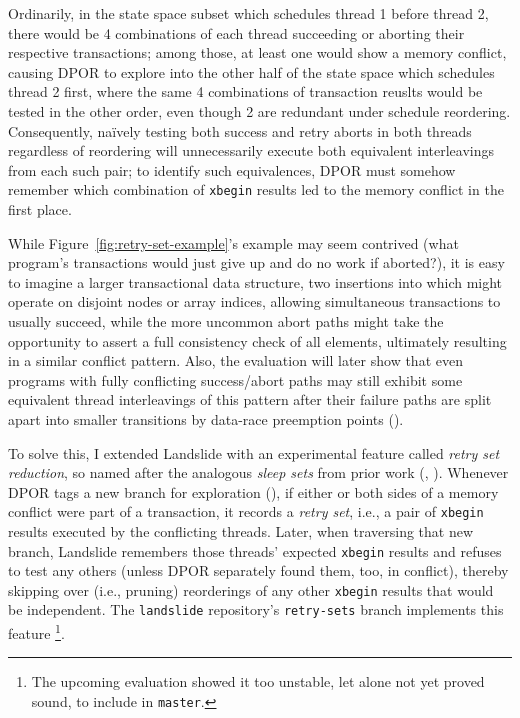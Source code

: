 Ordinarily, in the state space subset which schedules thread 1 before thread 2,
there would be 4 combinations of each thread succeeding or aborting their respective transactions;
among those, at least one would show a memory conflict,
causing DPOR to explore into the other half of the state space which schedules thread 2 first,
where the same 4 combinations of transaction reuslts would be tested in the other order,
even though 2 are redundant under schedule reordering.
Consequently, na\"ively testing both success and retry aborts in both threads regardless of reordering
will unnecessarily execute %
both equivalent interleavings from each such pair;
to identify such equivalences,
DPOR must somehow remember which combination of {\tt xbegin} results led to the memory conflict in the first place.

While Figure~\ref{fig:retry-set-example}'s example may seem contrived
(what program's transactions would just give up and do no work if aborted?),
it is easy to imagine a larger transactional data structure,
two insertions into which might operate on disjoint nodes or array indices,
allowing simultaneous transactions to usually succeed,
while the more uncommon abort paths might take the opportunity to assert a full consistency check of all elements,
ultimately resulting in a similar conflict pattern.
Also, the evaluation will later show
that even programs with fully conflicting success/abort paths
may still exhibit some equivalent thread interleavings of this pattern
after their failure paths are split apart into smaller transitions by data-race preemption points
(\sect{\ref{sec:tm-eval-retrysets}}).

To solve this,
I extended Landslide
with an experimental feature called {\em retry set reduction},
so named after the analogous {\em sleep sets} from prior work
(\cite{partial-order-methods,dpor,optimal-dpor}, \sect{\ref{sec:landslide-sleepsets}}).
Whenever DPOR tags a new branch for exploration (\sect{\ref{sec:landslide-explore}}),
if either or both sides of a memory conflict were part of a transaction,
it records a {\em retry set},
i.e., a pair of {\tt xbegin} results executed by the conflicting threads.
Later, when traversing that new branch,
Landslide remembers those threads' expected {\tt xbegin} results
and refuses to test any others
(unless DPOR separately found them, too, in conflict),
thereby skipping over (i.e., pruning) reorderings of any other {\tt xbegin} results that would be independent.
The {\tt landslide} repository's {\tt retry-sets} branch implements this feature%
\footnote{The upcoming evaluation showed it too unstable, let alone not yet proved sound, to include in {\tt master}.}.

